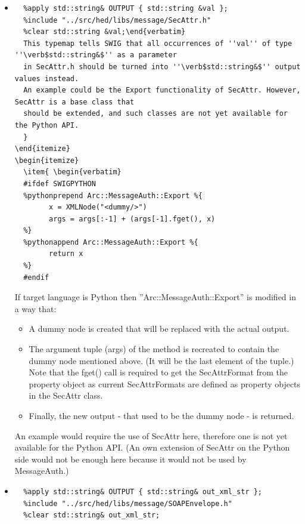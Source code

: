 \documentclass{article}
\begin{document}
\begin{flushleft}
\begin{itemize}
  \item{ \begin{verbatim}
  %apply std::string& OUTPUT { std::string &val };
  %include "../src/hed/libs/message/SecAttr.h"
  %clear std::string &val;\end{verbatim} 
  This typemap tells SWIG that all occurrences of ''val'' of type ''\verb$std::string&$'' as a parameter
  in SecAttr.h should be turned into ''\verb$std::string&$'' output values instead.
  An example could be the Export functionality of SecAttr. However, SecAttr is a base class that
  should be extended, and such classes are not yet available for the Python API.
  }
\end{itemize}
\begin{itemize}
  \item{ \begin{verbatim}
  #ifdef SWIGPYTHON
  %pythonprepend Arc::MessageAuth::Export %{
        x = XMLNode("<dummy/>")
        args = args[:-1] + (args[-1].fget(), x)
  %}
  %pythonappend Arc::MessageAuth::Export %{
        return x
  %}
  #endif \end{verbatim} 
  If target language is Python then ''Arc::MessageAuth::Export'' is modified in a way that: 
    \begin{itemize}
    \item{
      A dummy node is created that will be replaced with the actual output.
    }
    \item{
      The argument tuple (args) of the method is recreated to contain the dummy node mentioned above.
      (It will be the last element of the tuple.) Note that the fget() call is required to get the
      SecAttrFormat from the property object as current SecAttrFormats are defined as property objects
      in the SecAttr class.
    }
    \item{
      Finally, the new output - that used to be the dummy node - is returned.
    }
    \end{itemize}
  An example would require the use of SecAttr here, therefore one is not yet available for the Python API.
  (An own extension of SecAttr on the Python side would not be enough here because it would not be used by MessageAuth.)
  }
\end{itemize}
\begin{itemize}
  \item{ \begin{verbatim}
  %apply std::string& OUTPUT { std::string& out_xml_str }; 
  %include "../src/hed/libs/message/SOAPEnvelope.h"
  %clear std::string& out_xml_str;

\end{verbatim}}
\end{itemize}
\end{flushleft}
\end{document}
